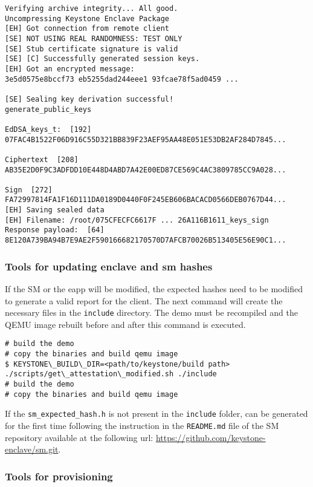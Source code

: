 \begin{lstlisting}[caption={Example of output at server side},captionpos=b,label={l-demo-s},style=DOS,frame=single]
Verifying archive integrity... All good.
Uncompressing Keystone Enclave Package
[EH] Got connection from remote client
[SE] NOT USING REAL RANDOMNESS: TEST ONLY
[SE] Stub certificate signature is valid
[SE] [C] Successfully generated session keys.
[EH] Got an encrypted message:
3e5d0575e8bccf73 eb5255dad244eee1 93fcae78f5ad0459 ...

[SE] Sealing key derivation successful!
generate_public_keys

EdDSA_keys_t:  [192]
07FAC4B1522F06D916C55D321BB839F23AEF95AA48E051E53DB2AF284D7845...

Ciphertext  [208]
AB35E2D0F9C3ADFDD10E448D4ABD7A42E00ED87CE569C4AC3809785CC9A028...

Sign  [272]
FA72997814FA1F16D111DA0189D0440F0F245EB606BACACD0566DEB0767D44...
[EH] Saving sealed data
[EH] Filename: /root/075CFECFC6617F ... 26A116B1611_keys_sign
Response payload:  [64]
8E120A739BA94B7E9AE2F590166682170570D7AFCB70026B513405E56E90C1...
\end{lstlisting}

\subsubsection{Tools for updating enclave and sm hashes}
If the SM or the eapp will be modified, the expected hashes need to be modified to generate a valid report for the client. The next command will create the necessary files in the \texttt{include} directory. The demo must be recompiled and the QEMU image rebuilt before and after this command is executed. 

\begin{lstlisting}[frame=single]
# build the demo
# copy the binaries and build qemu image
$ KEYSTONE\_BUILD\_DIR=<path/to/keystone/build path> ./scripts/get\_attestation\_modified.sh ./include
# build the demo
# copy the binaries and build qemu image
\end{lstlisting}

If the \texttt{sm\_expected\_hash.h} is not present in the \texttt{include} folder, can be generated for the first time following the instruction in the \texttt{README.md} file of the SM repository available at the following url: \url{https://github.com/keystone-enclave/sm.git}. 

\subsubsection{Tools for provisioning}

